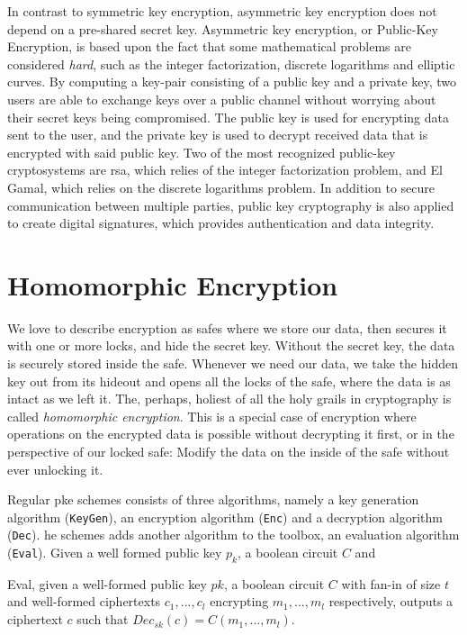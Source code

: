 In contrast to symmetric key encryption, asymmetric key encryption does not depend on a pre-shared secret key. Asymmetric key encryption, or Public-Key Encryption, is based upon the fact that some mathematical problems are considered \emph{hard}, such as the integer factorization, discrete logarithms and elliptic curves. By computing a key-pair consisting of a public key and a private key, two users are able to exchange keys over a public channel without worrying about their secret keys being compromised. The public key is used for encrypting data sent to the user, and the private key is used to decrypt received data that is encrypted with said public key. Two of the most recognized public-key cryptosystems are \gls{rsa}, which relies of the integer factorization problem, and El Gamal, which relies on the discrete logarithms problem. In addition to secure communication between multiple parties, public key cryptography is also applied to create digital signatures, which provides authentication and data integrity.


\section{Homomorphic Encryption}

We love to describe encryption as safes where we store our data, then secures it with one or more locks, and hide the secret key. Without the secret key, the data is securely stored inside the safe. Whenever we need our data, we take the hidden key out from its hideout and opens all the locks of the safe, where the data is as intact as we left it. The, perhaps, holiest of all the holy grails in cryptography is called \emph{homomorphic encryption}. This is a special case of encryption where operations on the encrypted data is possible without decrypting it first, or in the perspective of our locked safe: Modify the data on the inside of the safe without ever unlocking it.

Regular \gls{pke} schemes consists of three algorithms, namely a key generation algorithm (\texttt{KeyGen}), an encryption algorithm (\texttt{Enc}) and a decryption algorithm (\texttt{Dec}). \gls{he} schemes adds another algorithm to the toolbox, an evaluation algorithm (\texttt{Eval}). Given a well formed public key $p_k$, a boolean circuit $C$ and 



\begin{theorem}

Eval, given a well-formed public key $pk$, a boolean circuit $C$ with fan-in of size $t$ and well-formed ciphertexts $c_1, ... , c_l$ encrypting $m_1, ..., m_l$ respectively, outputs a ciphertext $c$ such that $Dec_{sk}(c) = C(m_1, ..., m_l)$.

\end{theorem}

